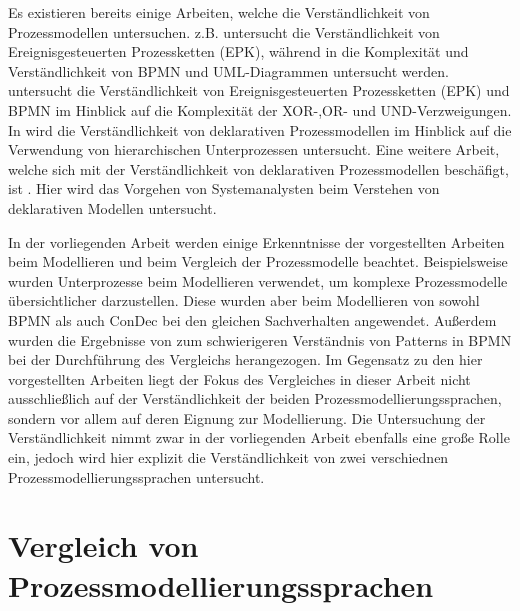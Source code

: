Es existieren bereits einige Arbeiten, welche die Verständlichkeit von Prozessmodellen untersuchen. \cite{bpm07} z.B. untersucht die Verständlichkeit von Ereignisgesteuerten Prozessketten (EPK), während in \cite{gruhn2006complexity} die Komplexität und Verständlichkeit von BPMN und UML-Diagrammen untersucht werden. \cite{reijers2011study} untersucht die Verständlichkeit von Ereignisgesteuerten Prozessketten (EPK) und BPMN im Hinblick auf die Komplexität der XOR-,OR- und UND-Verzweigungen. \newline
In \cite{sabrina942} wird die Verständlichkeit von deklarativen Prozessmodellen im Hinblick auf die Verwendung von hierarchischen Unterprozessen untersucht. Eine weitere Arbeit, welche sich mit der Verständlichkeit von deklarativen Prozessmodellen beschäfigt, ist \cite{haisjackl2014understanding}. Hier wird das Vorgehen von Systemanalysten beim Verstehen von deklarativen Modellen untersucht.\newline

In der vorliegenden Arbeit werden einige Erkenntnisse der vorgestellten Arbeiten beim Modellieren und beim Vergleich der Prozessmodelle beachtet. Beispielsweise wurden Unterprozesse beim  Modellieren verwendet, um komplexe Prozessmodelle übersichtlicher darzustellen. Diese wurden  aber beim Modellieren von sowohl BPMN als auch ConDec bei den gleichen Sachverhalten angewendet.\newline
Außerdem wurden die Ergebnisse von \cite{ haisjackl2014understanding} zum schwierigeren Verständnis von Patterns in BPMN bei der Durchführung des Vergleichs herangezogen.\newline
Im Gegensatz zu den hier vorgestellten Arbeiten liegt der Fokus des Vergleiches in dieser Arbeit nicht ausschließlich auf der Verständlichkeit der beiden Prozessmodellierungssprachen, sondern vor allem auf deren Eignung zur Modellierung. Die Untersuchung der Verständlichkeit nimmt zwar in der vorliegenden Arbeit ebenfalls eine große Rolle ein, jedoch wird hier explizit die Verständlichkeit von zwei verschiednen Prozessmodellierungssprachen untersucht.\newline


\section{Vergleich von Prozessmodellierungssprachen}

